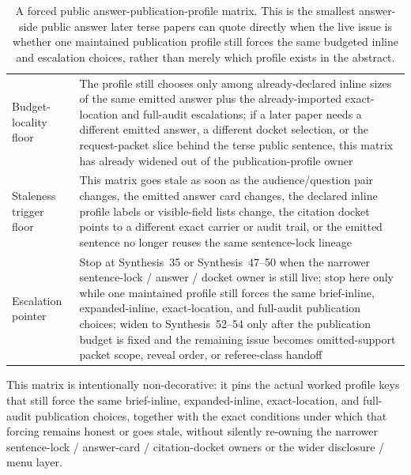 \documentclass[11pt]{article}
\begin{document}
\begin{table}[t]
\begin{tabularx}{\linewidth}{@{}lX@{}}
Budget-locality floor & The profile still chooses only among already-declared inline sizes of the same emitted answer plus the already-imported exact-location and full-audit escalations; if a later paper needs a different emitted answer, a different docket selection, or the request-packet slice behind the terse public sentence, this matrix has already widened out of the publication-profile owner \\
Staleness trigger floor & This matrix goes stale as soon as the audience/question pair changes, the emitted answer card changes, the declared inline profile labels or visible-field lists change, the citation docket points to a different exact carrier or audit trail, or the emitted sentence no longer reuses the same sentence-lock lineage \\
Escalation pointer & Stop at Synthesis~35 or Synthesis~47--50 when the narrower sentence-lock / answer / docket owner is still live; stop here only while one maintained profile still forces the same brief-inline, expanded-inline, exact-location, and full-audit publication choices; widen to Synthesis~52--54 only after the publication budget is fixed and the remaining issue becomes omitted-support packet scope, reveal order, or referee-class handoff \\
\bottomrule
\end{tabularx}
\caption{A forced public answer-publication-profile matrix. This is the smallest answer-side public answer later terse papers can quote directly when the live issue is whether one maintained publication profile still forces the same budgeted inline and escalation choices, rather than merely which profile exists in the abstract.}
\label{tab:forced-public-answer-publication-profile-matrix}
\end{table}

This matrix is intentionally non-decorative: it pins the actual worked profile keys that still force the same brief-inline, expanded-inline, exact-location, and full-audit publication choices, together with the exact conditions under which that forcing remains honest or goes stale, without silently re-owning the narrower sentence-lock / answer-card / citation-docket owners or the wider disclosure / menu layer.\cite{series:workedexample}
\end{document}
